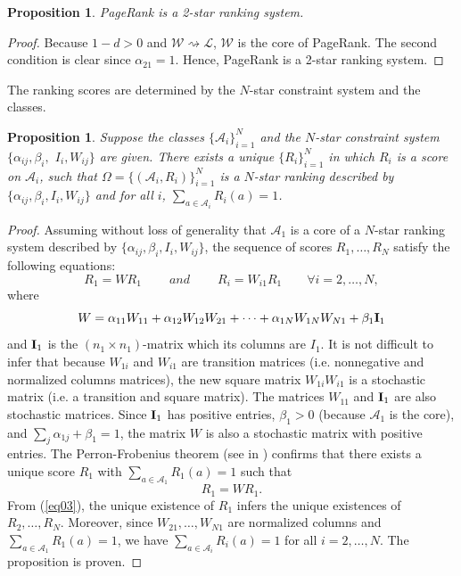\documentclass[10pt,leqno,twoside]{article}
\newtheorem{proposition}[theorem]{\indent Proposition}
\begin{document}
\begin{proposition}\label{prop:PR}
PageRank is a 2-star ranking system.
\end{proposition}
\begin{proof}
Because $1-d > 0$ and $\mathcal{W} \rightsquigarrow \mathcal{L}$, $\mathcal{W}$ is the core of PageRank. The second condition is clear since $\alpha_{21} = 1$. Hence, PageRank is a 2-star ranking system.
\end{proof}
The  ranking scores  are determined by  the $N$-star constraint system and the classes.
\begin{proposition}\label{prop:Existence}
Suppose the classes $\{\mathcal{A}_i\}^N_{i=1}$ and the $N$-star constraint system $\{\alpha_{ij}, \beta_{i},$ $I_i, W_{ij}\}$  are given. There exists a unique $\{R_i\}^N_{i=1}$ in which $R_i$ is a score on $\mathcal{A}_i$, such that $\Omega = \{(\mathcal{A}_i,R_i)\}^N_{i=1}$ is a $N$-star ranking described by $\{\alpha_{ij},\beta_{i},I_i,W_{ij}\}$ and for all $i$, $\sum_{a\in \mathcal{A}_i }R_i(a)=1$.
\end{proposition}
\begin{proof}
Assuming without loss of generality that $\mathcal{A}_1$ is a core of a $N$-star ranking system described by $\{\alpha_{ij},\beta_{i},I_i,W_{ij}\}$, the sequence of scores $R_1,\ldots,R_N$ satisfy the following equations:
\begin{equation}\label{eq03}
R_1 = WR_1 \qquad ~and~ \qquad
R_i = W_{i1}R_1 \qquad \forall i = 2,\ldots,N,
\end{equation}
where
\begin{equation}\label{eq39}
W = \alpha_{11}W_{11} + \alpha_{12}W_{12}W_{21} + \cdots + \alpha_{1N}W_{1N}W_{N1} + \beta_{1}{\bf I}_1
\end{equation}
and ${\bf I}_1$ is the $(n_1\times n_1)$-matrix which its columns are $I_1$. It is not difficult to infer that because $W_{1i}$ and $W_{i1}$ are transition matrices (i.e. nonnegative and normalized columns matrices), the new square matrix $W_{1i}W_{i1}$ is a stochastic matrix (i.e. a transition and square matrix). The matrices $W_{11}$ and ${\bf I}_1$ are also stochastic matrices. Since ${\bf I}_1$ has positive entries, $\beta_1 > 0$ (because $\mathcal{A}_1$ is the core), and $\sum_j\alpha_{1j} + \beta_1 = 1$, the matrix $W$ is also a stochastic matrix with positive entries. The Perron-Frobenius theorem (see in \cite{Keener1993,Kien09}) confirms that there exists a unique score $R_1$ with $\sum_{a\in\mathcal{A}_1}R_1(a) = 1$ such that
\[R_1 = WR_1.\]
From (\ref{eq03}), the unique existence of $R_1$ infers the unique existences of $R_2,\ldots,R_N$. Moreover, since $W_{21}, \ldots,W_{N1}$ are normalized columns and $\sum_{a\in\mathcal{A}_1}R_1(a) = 1$, we have $\sum_{a\in\mathcal{A}_i}R_i(a) = 1$ for all $i = 2,\ldots,N$. The proposition is proven.
\end{proof}
\end{document}
